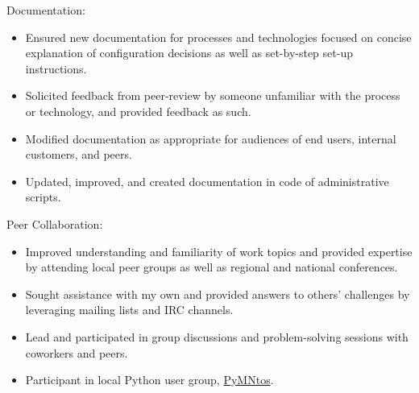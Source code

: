 \documentclass[line,margin]{res}
\begin{document}
\begin{resume}
    Documentation:
    \vspace{2 mm}
    \begin{itemize} \itemsep -1pt %
        \item Ensured new documentation for processes and technologies
        focused on concise explanation of configuration decisions as well
        as set-by-step set-up instructions.
        \item Solicited feedback from peer-review by someone unfamiliar
        with the process or technology, and provided feedback as such.
        \item Modified documentation as appropriate for audiences of end
        users, internal customers, and peers.
        \item Updated, improved, and created documentation in code of
        administrative scripts.
    \end{itemize}

    Peer Collaboration:
    \vspace{2 mm}
    \begin{itemize} \itemsep -1pt %
        \item Improved understanding and familiarity of work topics and
        provided expertise by attending local peer groups as well as
        regional and national conferences.
        \item Sought assistance with my own and provided answers to
        others' challenges by leveraging mailing lists and IRC channels.
        \item Lead and participated in group discussions and
        problem-solving sessions with coworkers and peers.
        \item Participant in local Python user group,
        \href{http://www.python.mn/}{PyMNtos}. 
    \end{itemize}


\end{resume}
\end{document}
